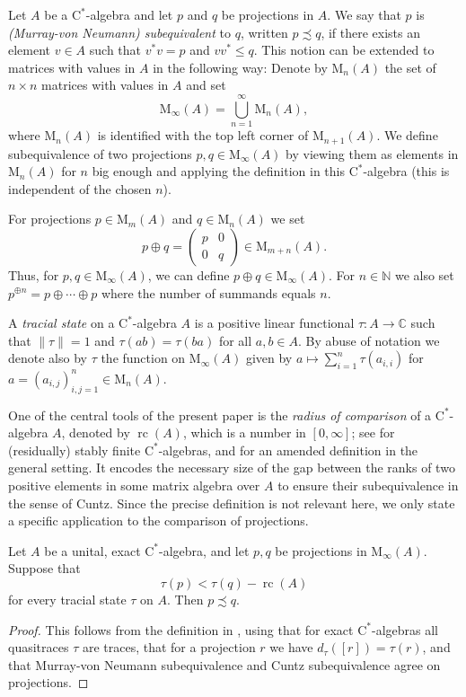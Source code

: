 \documentclass[reqno, a4paper]{amsart}
\numberwithin{equation}{section}
\newcommand{\N}{\mathbb{N}}   %
\newcommand{\C}{\mathbb{C}}   %
\newcommand{\ca}{$\mathrm{C}^*$-algebra}
\DeclareMathOperator{\rc}{rc}
\begin{document}
Let $A$ be a \ca{} and let $p$ and $q$ be projections in $A$. 
We say that $p$ is \emph{(Murray-von Neumann) subequivalent} to $q$, written $p \precsim q$, if there exists an element $v \in A$ such that $v^*v = p$ and $vv^* \leq q$. This notion can be extended to matrices with values in $A$ in the following way: Denote by $\mathrm{M}_n(A)$ the set of $n \times n$ matrices with values in $A$ and set
\[ 
\mathrm{M}_\infty(A) = \bigcup_{n=1}^\infty \mathrm{M}_n(A),
\]
where $\mathrm{M}_n(A)$ is identified with the top left corner of $\mathrm{M}_{n+1}(A)$. 
We define subequivalence of two projections $p,q \in \mathrm{M}_\infty(A)$ by viewing them as elements in $\mathrm{M}_n(A)$ for $n$ big enough and applying the definition in this \ca{} (this is independent of the chosen $n$).

For projections $p \in \mathrm{M}_m(A)$ and $q \in \mathrm{M}_n(A)$ we set
\[ 
p \oplus q = \begin{pmatrix} p & 0 \\ 0 & q \end{pmatrix} \in \mathrm{M}_{m+n}(A). 
\]
Thus, for $p,q \in \mathrm{M}_\infty(A)$, we can define $p \oplus q \in \mathrm{M}_\infty(A)$. 
For $n \in \N$ we also set $p^{\oplus n} = p \oplus \cdots \oplus p$ where the number of summands equals $n$.

A \emph{tracial state} on a \ca{} $A$ is a positive linear functional $\tau \colon A \to \C$ such that $\| \tau \| = 1$ and $\tau(ab) = \tau(ba)$ for all $a,b \in A$.
By abuse of notation we denote also by $\tau$ the function on $\mathrm{M}_\infty(A)$ given by $a \mapsto \sum_{i=1}^n \tau(a_{i,i})$ for $a = (a_{i,j})_{i,j=1}^n \in \mathrm{M}_n(A)$.

One of the central tools of the present paper is the \emph{radius of comparison} of a \ca{} $A$, denoted by $\rc(A)$, which is a number in $[0,\infty]$; 
see \cite[Definition~6.1]{Tom06FlatDimGrowth} for (residually) stably finite \ca{s}, and \cite{BlaRobTikTomWin12AlgRC} for an amended definition in the general setting.
It encodes the necessary size of the gap between the ranks of two positive elements in some matrix algebra over $A$ to ensure their subequivalence in the sense of Cuntz.
Since the precise definition is not relevant here, we only state a specific application to the comparison of projections.

\begin{lemma}
\label{lem:radius}
Let $A$ be a unital, exact \ca{}, and let $p,q$ be projections in $\mathrm{M}_\infty(A)$.
Suppose that
\[
\tau(p)  < \tau(q) - \rc(A)
\]
for every tracial state $\tau$ on $A$. 
Then $p \precsim q$.
\end{lemma}
\begin{proof}
This follows from the definition in \cite[Section~3.1]{BlaRobTikTomWin12AlgRC}, using that for exact \ca{s} all quasitraces $\tau$ are traces, that for a projection $r$ we have $d_\tau([r])=\tau(r)$, and that Murray-von Neumann subequivalence and Cuntz subequivalence agree on projections.
\end{proof}
\end{document}
